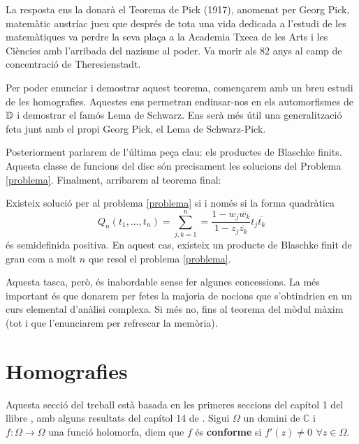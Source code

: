 \documentclass[dvipsnames, svgnames, leqno, a4paper, 12pt]{article}
\begin{document}
        La resposta ens la donarà el Teorema de Pick (1917), anomenat per Georg Pick, matemàtic austríac jueu que després de tota una vida dedicada a l'estudi de les matemàtiques va perdre la seva plaça a la Academia Txeca de les Arts i les Ciències amb l'arribada del nazisme al poder. Va morir als 82 anys al camp de concentració de Theresienstadt.


        Per poder enunciar i demostrar aquest teorema, començarem amb un breu estudi de les homografies. Aquestes ens permetran endinsar-nos en els automorfismes de \(\mathbb{D}\) i demostrar el famós Lema de Schwarz. Ens serà més útil una generalització feta junt amb el propi Georg Pick, el Lema de Schwarz-Pick.

        Posteriorment parlarem de l'última peça clau: els productes de Blaschke finits. Aquesta classe de funcions del disc són precisament les solucions del Problema \ref{problema}. Finalment, arribarem al teorema final:
        \begin{theorem*}[Pick]
            Existeix solució per al problema \ref{problema} 
            si i només si la forma quadràtica \begin{displaymath}
                Q_n(t_1,\dots,t_n)=\sum_{j,k=1}^n=\frac{1-w_j\overline{w_k}}{1-z_j\overline{z_k}}t_j\overline{t_k}
            \end{displaymath}
            és semidefinida positiva. En aquest cas, existeix un producte de Blaschke finit de grau com a molt $n$ que resol el problema \ref{problema}.
        \end{theorem*}

        Aquesta tasca, però, és inabordable sense fer algunes concessions. La més important és que donarem per fetes la majoria de nocions que s'obtindrien en un curs elemental d'anàlisi complexa. Si més no, fins al teorema del mòdul màxim (tot i que l'enunciarem per refrescar la memòria).



    \section{Homografies}
    Aquesta secció del treball està basada en les primeres seccions del capítol 1 del llibre \cite{ford_1972}, amb alguns resultats del capítol 14 de \cite{rudin_1974}.
        Sigui  \(\Omega\) un domini de \(\mathbb{C}\) i \(f: \Omega\to\Omega\) una funció holomorfa, diem que \(f\) és \textbf{conforme} si \(f'(z) \neq 0\,\  \forall z\in\Omega\).
        
\end{document}
